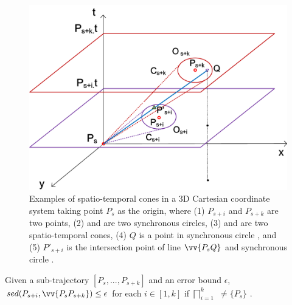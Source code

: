 




\begin{figure}[tb!]
	\centering
	\includegraphics[scale=0.66]{figures/Fig-CIS.png}
	\caption{\small Examples of spatio-temporal cones in a 3D Cartesian coordinate system taking point $P_s$ as the origin, where (1) $P_{s+i}$ and $P_{s+k}$ are two points, (2)  and  are two synchronous circles, (3)  and  are two spatio-temporal cones, (4) $Q$ is a point in synchronous circle , and (5) $P'_{s+i}$ is the intersection point of line $\protect\vv{P_sQ}$ and synchronous circle .}
	\label{fig:cis}
\end{figure}




\begin{theorem}
\label{theo-half-cone}
{Given a sub-trajectory $[P_s,...,P_{s+k}]$ and an error bound $\epsilon$, $sed(P_{s+i}, \vv{P_sP_{s+k}})\le \epsilon$ for each $i \in [1,k]$ if  $\bigsqcap_{i=1}^{k}$ $\ne \{P_s\}$} \cite{Lin:Cised}.
\end{theorem}

